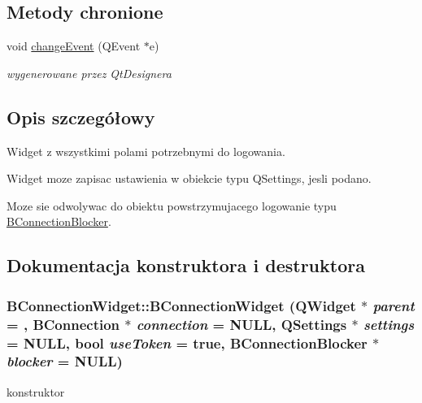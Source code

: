\subsection*{Metody chronione}
\begin{DoxyCompactItemize}
\item 
void \hyperlink{class_b_connection_widget_a7396f6332ea7735a6a330fc11927d183}{changeEvent} (QEvent $\ast$e)
\begin{DoxyCompactList}\small\item\em wygenerowane przez QtDesignera \item\end{DoxyCompactList}\end{DoxyCompactItemize}


\subsection{Opis szczegółowy}
Widget z wszystkimi polami potrzebnymi do logowania. \begin{DoxyItemize}
\item Widget moze zapisac ustawienia w obiekcie typu QSettings, jesli podano. \item Moze sie odwolywac do obiektu powstrzymujacego logowanie typu \hyperlink{class_b_connection_blocker}{BConnectionBlocker}. \end{DoxyItemize}


\subsection{Dokumentacja konstruktora i destruktora}
\hypertarget{class_b_connection_widget_af549f688fe132260b6a1333cde59dba7}{
\subsubsection[{BConnectionWidget}]{\setlength{\rightskip}{0pt plus 5cm}BConnectionWidget::BConnectionWidget (QWidget $\ast$ {\em parent} = {}, \/  {\bf BConnection} $\ast$ {\em connection} = {\ttfamily NULL}, \/  QSettings $\ast$ {\em settings} = {\ttfamily NULL}, \/  bool {\em useToken} = {\ttfamily true}, \/  {\bf BConnectionBlocker} $\ast$ {\em blocker} = {\ttfamily NULL})}}
\label{class_b_connection_widget_af549f688fe132260b6a1333cde59dba7}


konstruktor 

